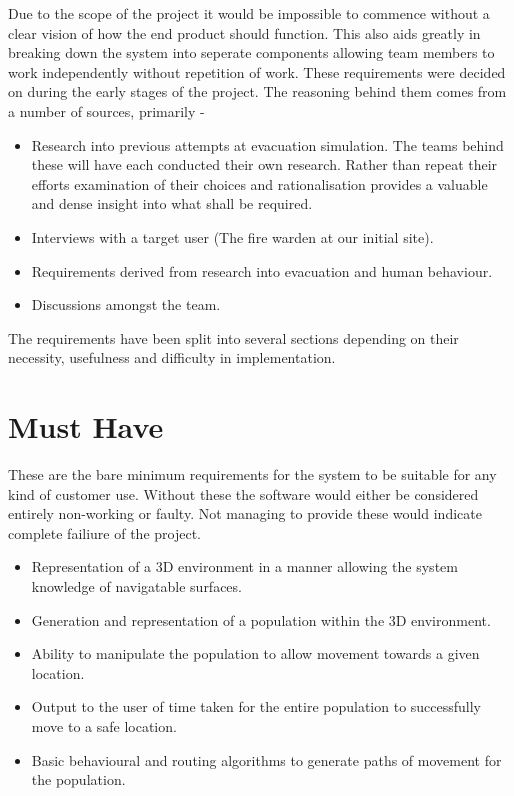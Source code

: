 



Due to the scope of the project it would be impossible to commence
without a clear vision of how the end product should function. This
also aids greatly in breaking down the system into seperate components
allowing team members to work independently without repetition of
work. These requirements were decided on during the early stages of
the project. The reasoning behind them comes from a number of sources,
primarily -
\begin{itemize}
\item Research into previous attempts at evacuation simulation. The teams
behind these will have each conducted their own research. Rather than
repeat their efforts examination of their choices and rationalisation
provides a valuable and dense insight into what shall be required.
\item Interviews with a target user (The fire warden at our initial site).
\item Requirements derived from research into evacuation and human behaviour.
\item Discussions amongst the team.
\end{itemize}
The requirements have been split into several sections depending on
their necessity, usefulness and difficulty in implementation.


\section{Must Have}

These are the bare minimum requirements for the system to be suitable
for any kind of customer use. Without these the software would either
be considered entirely non-working or faulty. Not managing to provide
these would indicate complete failiure of the project.
\begin{itemize}
\item Representation of a 3D environment in a manner allowing the system
knowledge of navigatable surfaces.
\item Generation and representation of a population within the 3D environment.
\item Ability to manipulate the population to allow movement towards a given
location.
\item Output to the user of time taken for the entire population to successfully
move to a safe location.
\item Basic behavioural and routing algorithms to generate paths of movement
for the population.
\end{itemize}

